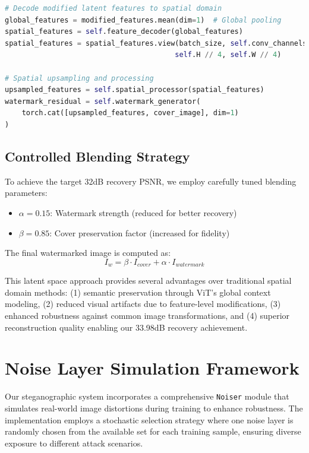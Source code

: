 \documentclass[12pt,a4paper]{report}
\begin{document}
\begin{lstlisting}[language=Python, caption=Latent-to-Spatial Decoding]
# Decode modified latent features to spatial domain
global_features = modified_features.mean(dim=1)  # Global pooling
spatial_features = self.feature_decoder(global_features)
spatial_features = spatial_features.view(batch_size, self.conv_channels, 
                                        self.H // 4, self.W // 4)

# Spatial upsampling and processing
upsampled_features = self.spatial_processor(spatial_features)
watermark_residual = self.watermark_generator(
    torch.cat([upsampled_features, cover_image], dim=1)
)
\end{lstlisting}

\subsection{Controlled Blending Strategy}

To achieve the target 32dB recovery PSNR, we employ carefully tuned blending parameters:

\begin{itemize}
    \item $\alpha = 0.15$: Watermark strength (reduced for better recovery)
    \item $\beta = 0.85$: Cover preservation factor (increased for fidelity)
\end{itemize}

The final watermarked image is computed as:
\begin{equation}
I_w = \beta \cdot I_{cover} + \alpha \cdot I_{watermark}
\end{equation}

This latent space approach provides several advantages over traditional spatial domain methods: (1) semantic preservation through ViT's global context modeling, (2) reduced visual artifacts due to feature-level modifications, (3) enhanced robustness against common image transformations, and (4) superior reconstruction quality enabling our 33.98dB recovery achievement.

\section{Noise Layer Simulation Framework}

Our steganographic system incorporates a comprehensive \texttt{Noiser} module that simulates real-world image distortions during training to enhance robustness. The implementation employs a stochastic selection strategy where one noise layer is randomly chosen from the available set for each training sample, ensuring diverse exposure to different attack scenarios.
\end{document}
